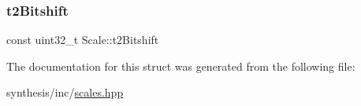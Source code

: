 \subsubsection{\texorpdfstring{t2\+Bitshift}{t2Bitshift}}
{\footnotesize\ttfamily const uint32\+\_\+t Scale\+::t2\+Bitshift}



The documentation for this struct was generated from the following file\+:\begin{DoxyCompactItemize}
\item 
synthesis/inc/\mbox{\hyperlink{scales_8hpp}{scales.\+hpp}}\end{DoxyCompactItemize}
